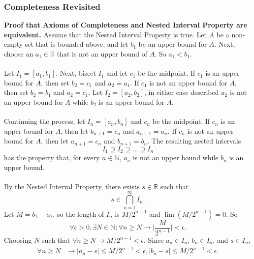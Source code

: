 \documentclass{article}
\begin{document}
            \subsubsection{Completeness Revisited}
            \textbf{Proof that Axioms of Completeness and Nested Interval Property are equivalent.} Assume that the Nested Interval Property is true. Let $A$ be a non-empty set that is bounded above, and let $b_1$ be an upper bound for $A$. Next, choose an $a_1 \in \mathbb{R}$ that is not an upper bound of $A$. So $a_1 < b_1$. \\ \\
            Let $I_1 = [a_1,b_1]$. Next, bisect $I_1$ and let $c_1$ be the midpoint. If $c_1$ is an upper bound for $A$, then set $b_2=c_1$ and $a_2=a_1$. If $c_1$ is not an upper bound for $A$, then set $b_2=b_1$ and $a_2=c_1$. Let $I_2=[a_2,b_2]$, in either case described $a_2$ is not an upper bound for $A$ while $b_2$ is an upper bound for $A$.\\ \\
            Continuing the process, let $I_n = [a_n,b_n]$ and $c_n$ be the midpoint. If $c_n$ is an upper bound for $A$, then let $b_{n+1}=c_n$ and $a_{n+1}=a_n$. If $c_n$ is not an upper bound for $A$, then let $a_{n+1}=c_n$ and $b_{n+1}=b_n$. The resulting nested intervals
            \begin{equation*}
                I_1 \supseteq I_2 \supseteq \dots \supseteq I_n
            \end{equation*}
            has the property that, for every $n \in \mathbb{N}$, $a_n$ is not an upper bound while $b_n$ is an upper bound.\\ \\
            By the Nested Interval Property, there exists $s \in \mathbb{R}$ such that
            \begin{equation*}
                s \in \bigcap_{n=1}^\infty I_n.
            \end{equation*}
            Let $M=b_1-a_1$, so the length of $I_n$ is $M/2^{n-1}$ and $\lim(M/2^{n-1})=0$. So
            \begin{equation*}
                \forall \epsilon > 0, \exists N \in \mathbb{N}: \forall n \geq N \longrightarrow \bigg|\frac{M}{2^{n-1}}\bigg| < \epsilon.
            \end{equation*}
            Choosing $N$ such that $\forall n \geq N \longrightarrow M/2^{n-1} < \epsilon$. Since $a_n \in I_n$, $b_n \in I_n$, and $s \in I_n$,
            \begin{align*}
                \forall n \geq N & \longrightarrow |a_n - s| \leq M/2^{n-1} < \epsilon, |b_n - s| \leq M/2^{n-1} < \epsilon.
            \end{align*}
\end{document}
